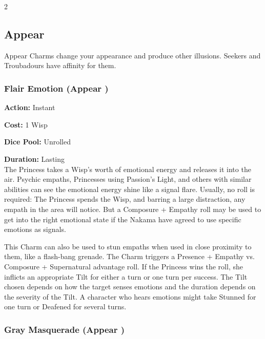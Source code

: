 \begin{multicols}{2}
\subsection*{Appear}
\label{subsec:Appear}

Appear Charms change your appearance and produce other illusions. Seekers and Troubadours have affinity for them. 

\subsubsection*{Flair Emotion (Appear \textbullet)}

\noindent \textbf{Action:} Instant 

\noindent \textbf{Cost:} 1 Wisp 

\noindent \textbf{Dice Pool:} Unrolled 

\noindent \textbf{Duration:} Lasting \\

\noindent The Princess takes a Wisp's worth of emotional energy and releases it into the air. Psychic empaths, Princesses using Passion’s Light, and others with similar abilities can see the emotional energy shine like a signal flare. Usually, no roll is required: The Princess spends the Wisp, and barring a large distraction, any empath in the area will notice. But a Composure + Empathy roll may be used to get into the right emotional state if the Nakama have agreed to use specific emotions as signals. 

This Charm can also be used to stun empaths when used in close proximity to them, like a flash-bang grenade. The Charm triggers a Presence + Empathy vs. Composure + Supernatural advantage roll. If the Princess wins the roll, she inflicts an appropriate Tilt for either a turn or one turn per success. The Tilt chosen depends on how the target senses emotions and the duration depends on the severity of the Tilt. A character who hears emotions might take Stunned for one turn or Deafened for several turns. 


\subsubsection*{Gray Masquerade (Appear \textbullet)}


\end{multicols}
